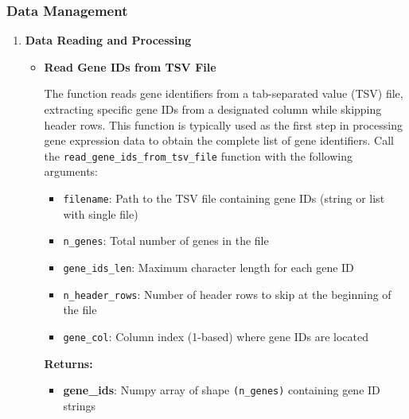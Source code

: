 \documentclass[11pt]{article}
\begin{document}
\subsubsection{Data Management}
\begin{enumerate}
	\item \textbf{Data Reading and Processing}
	      \begin{itemize}
	      	\item \textbf{Read Gene IDs from TSV File}
	      	      
	      	      The function reads gene identifiers from a tab-separated value (TSV) file,
	      	      extracting specific gene IDs from a designated column while skipping
	      	      header rows. This function is typically used as the first step in processing
	      	      gene expression data to obtain the complete list of gene identifiers.
	      	      Call the \texttt{read\_gene\_ids\_from\_tsv\_file} function with the following
	      	      arguments:
	      	      
	      	      \begin{itemize}
	      	      	\item \texttt{filename}: Path to the TSV file containing gene IDs (string
	      	      	      or list with single file)
	      	      	      
	      	      	\item \texttt{n\_genes}: Total number of genes in the file
	      	      	      
	      	      	\item \texttt{gene\_ids\_len}: Maximum character length for each gene
	      	      	      ID
	      	      	      
	      	      	\item \texttt{n\_header\_rows}: Number of header rows to skip at the
	      	      	      beginning of the file
	      	      	      
	      	      	\item \texttt{gene\_col}: Column index (1-based) where gene IDs are located
	      	      \end{itemize}
	      	      
	      	      \textbf{Returns:}
	      	      \begin{itemize}
	      	      	\item \textbf{gene\_ids}: Numpy array of shape \texttt{(n\_genes)}
	      	      	      containing gene ID strings
	      	      \end{itemize}
	      	      

\end{itemize}
\end{enumerate}
\end{document}
